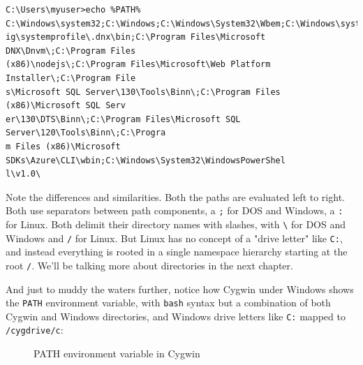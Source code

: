 \documentclass[10pt,american,]{book}
\newenvironment{Shaded}{\begin{snugshade}}{\end{snugshade}}
\newcommand{\KeywordTok}[1]{\textcolor[rgb]{0.13,0.29,0.53}{\textbf{{#1}}}}
\newcommand{\OtherTok}[1]{\textcolor[rgb]{0.56,0.35,0.01}{{#1}}}
\newcommand{\NormalTok}[1]{{#1}}
\numberwithin{figure}{chapter}
\DeclareRobustCommand{\drcap}[1]{\begin{figure}[H]\caption{#1}\end{figure}}
\DeclareRobustCommand{\drshl}[1]{\index{Shells!#1}}
\renewcommand{\KeywordTok}[1]{{#1}}
\renewcommand{\OtherTok}[1]{{#1}}
\renewcommand{\NormalTok}[1]{{#1}}
\begin{document}
\begin{verbatim}
C:\Users\myuser>echo %PATH%
C:\Windows\system32;C:\Windows;C:\Windows\System32\Wbem;C:\Windows\system32\conf
ig\systemprofile\.dnx\bin;C:\Program Files\Microsoft DNX\Dnvm\;C:\Program Files
(x86)\nodejs\;C:\Program Files\Microsoft\Web Platform Installer\;C:\Program File
s\Microsoft SQL Server\130\Tools\Binn\;C:\Program Files (x86)\Microsoft SQL Serv
er\130\DTS\Binn\;C:\Program Files\Microsoft SQL Server\120\Tools\Binn\;C:\Progra
m Files (x86)\Microsoft SDKs\Azure\CLI\wbin;C:\Windows\System32\WindowsPowerShel
l\v1.0\
\end{verbatim}

Note the differences and similarities. Both the paths are evaluated left
to right. Both use separators between path components, a \texttt{;} for
DOS and Windows, a \texttt{:} for Linux. Both delimit their directory
names with slashes, with \texttt{\textbackslash{}} for DOS and Windows
and \texttt{/} for Linux. But Linux has no concept of a "drive letter"
like \texttt{C:}, and instead everything is rooted in a single namespace
hierarchy starting at the root \texttt{/}. We'll be talking more about
directories in the next chapter.

And just to muddy the waters further, notice how Cygwin\drshl{Cygwin}
under Windows shows the \texttt{PATH} environment variable, with
\texttt{bash} syntax but a combination of both Cygwin and Windows
directories, and Windows drive letters like \texttt{C:} mapped to
\texttt{/cygdrive/c}:

\drcap{PATH environment variable in Cygwin}

\begin{Shaded}
\end{Shaded}
\end{document}
